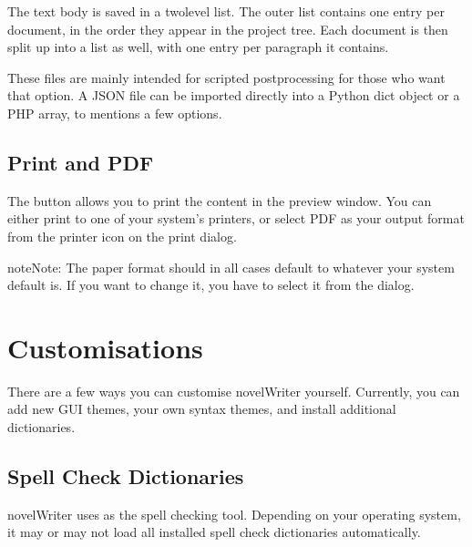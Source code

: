 \documentclass[a4paper,11pt,english]{sphinxmanual}
\begin{document}
\sphinxAtStartPar
The text body is saved in a two\sphinxhyphen{}level list. The outer list contains one entry per document, in the
order they appear in the project tree. Each document is then split up into a list as well, with one
entry per paragraph it contains.

\sphinxAtStartPar
These files are mainly intended for scripted post\sphinxhyphen{}processing for those who want that option. A JSON
file can be imported directly into a Python dict object or a PHP array, to mentions a few options.


\section{Print and PDF}
\label{\detokenize{project_manuscript:print-and-pdf}}\label{\detokenize{project_manuscript:a-manuscript-print}}
\sphinxAtStartPar
The  button allows you to print the content in the preview window. You can either
print to one of your system’s printers, or select PDF as your output format from the printer icon
on the print dialog.

\begin{sphinxadmonition}{note}{Note:}
\sphinxAtStartPar
The paper format should in all cases default to whatever your system default is. If you want to
change it, you have to select it from the  dialog.
\end{sphinxadmonition}

\sphinxstepscope


\chapter{Customisations}
\label{\detokenize{more_customise:customisations}}\label{\detokenize{more_customise:a-custom}}\label{\detokenize{more_customise::doc}}
\sphinxAtStartPar
There are a few ways you can customise novelWriter yourself. Currently, you can add new GUI themes,
your own syntax themes, and install additional dictionaries.


\section{Spell Check Dictionaries}
\label{\detokenize{more_customise:spell-check-dictionaries}}\label{\detokenize{more_customise:a-custom-dict}}
\sphinxAtStartPar
novelWriter uses  as the spell checking tool. Depending on your operating system, it may or
may not load all installed spell check dictionaries automatically.
\end{document}
